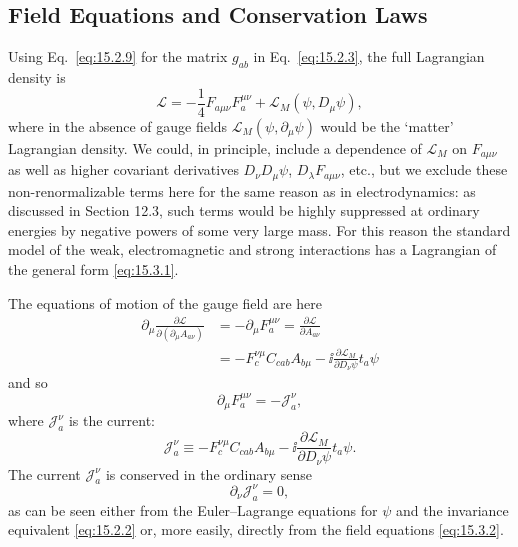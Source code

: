 
\subsection{Field Equations and Conservation Laws}
\label{sec:15.3}

Using Eq.~\eqref{eq:15.2.9} for the matrix $g_{ab}$ in
Eq.~\eqref{eq:15.2.3}, the full Lagrangian density is
\begin{equation}
 \mathcal L=-\frac14F_{a\mu\nu}F_a^{\mu\nu}
 +\mathcal L_M(\psi,D_\mu\psi) ,
 \tag{15.3.1}\label{eq:15.3.1}
\end{equation}
where in the absence of gauge fields $\mathcal L_M(\psi,\partial_\mu\psi)$ would
be the `matter' Lagrangian density. We could, in principle, include a dependence
of $\mathcal L_M$ on $F_{a\mu\nu}$ as well as higher covariant derivatives
$D_\nu D_\mu\psi$, $D_\lambda F_{a\mu\nu}$, etc., but we exclude these
non-renormalizable terms here for the same reason as in electrodynamics: as
discussed in Section 12.3, such terms would be highly suppressed at ordinary
energies by negative powers of some very large mass. For this reason the standard
model of the weak, electromagnetic and strong interactions has a Lagrangian of
the general form \eqref{eq:15.3.1}.

The equations of motion of the gauge field are here
\begin{align*}
 \partial_\mu\frac{\partial\mathcal L}{\partial(\partial_\mu A_{a\nu})}
 &=-\partial_\mu F_a^{\mu\nu}
 =\frac{\partial\mathcal L}{\partial A_{a\nu}}\\
 &=-F_c^{\nu\mu}C_{cab}A_{b\mu}
 -\ii\frac{\partial\mathcal L_M}{\partial D_\nu\psi}t_a\psi
\end{align*}
and so
\begin{equation}
 \partial_\mu F_a^{\mu\nu}=-\mathcal J_a^\nu ,
 \tag{15.3.2}\label{eq:15.3.2}
\end{equation}
where $\mathcal J_a^\nu$ is the current:
\begin{equation}
 \mathcal J_a^\nu\equiv
 -F_c^{\nu\mu}C_{cab}A_{b\mu}
 -\ii\frac{\partial\mathcal L_M}{\partial D_\nu\psi}t_a\psi .
 \tag{15.3.3}\label{eq:15.3.3}
\end{equation}
The current $\mathcal J_a^\nu$ is conserved in the ordinary sense
\begin{equation}
 \partial_\nu\mathcal J_a^\nu=0 ,
 \tag{15.3.4}\label{eq:15.3.4}
\end{equation}
as can be seen either from the Euler--Lagrange equations for $\psi$ and the
invariance equivalent \eqref{eq:15.2.2} or, more easily, directly from the field
equations \eqref{eq:15.3.2}.

